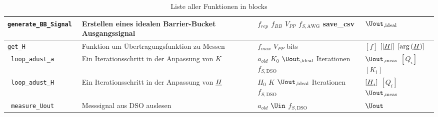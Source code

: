 \documentclass[../Report.tex]{subfiles}
\begin{document}
\begin{table}[H]
\begin{tabular}[t]{| >{\texttt\bgroup}m{3.5cm}<{\egroup}|m{8cm}|m{2cm}|m{2cm}|}
  \hline
  generate\_BB\_Signal & Erstellen eines idealen Barrier-Bucket Ausgangssignal & $f_{rep}$ \newline $f_{BB}$ \newline $V_{PP}$ \newline $f_{S,\textrm{AWG}}$ \newline save\_csv & $\Uout_{,\textrm{ideal}}$\\
  \hline
  get\_H & Funktion um Übertragungsfunktion zu Messen & $f_{max}$ \newline $V_{PP}$ \newline bits & $[f]$ \newline $[|\underline{H}|]$ \newline $[\arg{(\underline{H})}]$\\
  \hline
  loop\_adust\_a & Ein Iterationsschritt in der Anpassung von $K$ & $a_{old}$ \newline $K_0$ \newline $\Uout_{,\textrm{ideal}}$ \newline Iterationen \newline $f_{S,\textrm{DSO}}$ & $\Uout_{,\textrm{meas}}$ \newline$[Q_i]$ \newline $[K_i]$\\
  \hline
  loop\_adust\_H & Ein Iterationsschritt in der Anpassung von $\underline{H}$ & $H_0$ \newline $K$ \newline $\Uout_{,\textrm{ideal}}$ \newline Iterationen \newline $f_{S,\textrm{DSO}}$ & $[\underline{H}_i]$ \newline $[Q_i]$ \newline $\Uout_{,\textrm{meas}}$\\
  \hline
  measure\_Uout & Messsignal aus DSO auslesen & $a_{old}$ \newline $\Uin$ \newline $f_{S,\textrm{DSO}}$ & $\Uout$\\
  \hline
\end{tabular}
\caption{Liste aller Funktionen in blocks}
\label{tab:anhang.Funktionen.blocks}
\end{table}
\end{document}
